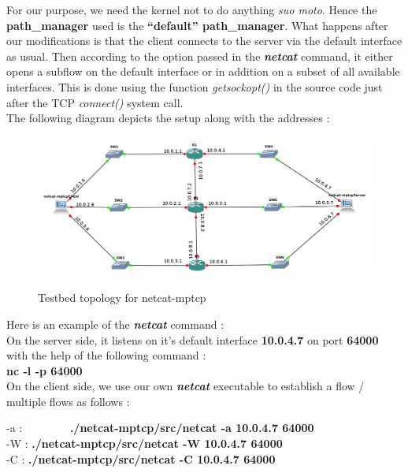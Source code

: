 \documentclass[a4paper,11pt]{article}
\begin{document}
			For our purpose, we need the kernel not to do anything \emph{suo moto}. Hence the \textbf{path\_manager} used is the \textbf{``default'' path\_manager}. What happens after our modifications is that the client connects to the server via the default interface as usual. Then according to the option passed in the \textbf{\emph{netcat}} command, it either opens a subflow on the default interface or in addition on a subset of all available interfaces. This is done using the function \emph{getsockopt()} in the source code just after the TCP \emph{connect()} system call. \\
			The following diagram depicts the setup along with the addresses :
			\begin{figure}[h]
				\begin{center}
					\label{fig:topology}
					\includegraphics[scale=0.45]{pictures/topologie.jpg}
					\caption[]{Testbed topology for netcat-mptcp}
				\end{center}
			\end{figure}

			Here is an example of the \textbf{\emph{netcat}} command : \\
			On the server side, it listens on it's default interface \textbf{10.0.4.7} on port \textbf{64000} with the help of the following command : \\

			\textbf{nc -l -p 64000} \\

			On the client side, we use our own \textbf{\emph{netcat}} executable to establish a flow / multiple flows as follows :

			
			\begin{tabbing}
			-a : ~~~~~~~~\=\textbf{./netcat-mptcp/src/netcat -a 10.0.4.7 64000} \\
			-W : \> \textbf{./netcat-mptcp/src/netcat -W 10.0.4.7 64000} \\
			-C : \> \textbf{./netcat-mptcp/src/netcat -C 10.0.4.7 64000}
			\end{tabbing}
\end{document}
